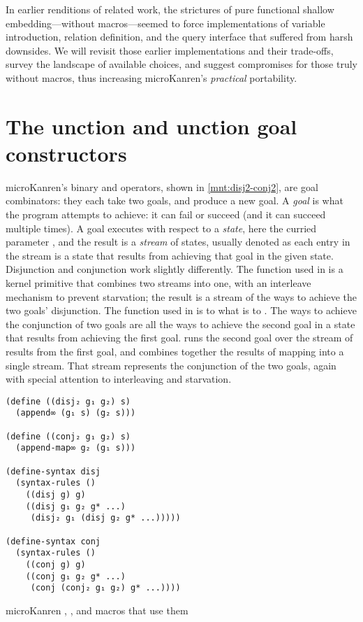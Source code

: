 \documentclass[sigplan,balance=true,pbalance=true,natbib=false]{acmart}
\begin{document}
In earlier renditions of related work, the strictures of pure
functional shallow embedding---without macros---seemed to force
implementations of variable introduction, relation definition, and the
query interface that suffered from harsh downsides. We will revisit
those earlier implementations and their trade-offs, survey the
landscape of available choices, and suggest compromises for those
truly without macros, thus increasing microKanren's \emph{practical}
portability.

\section{The \textmd{}unction and \textmd{}unction
  goal constructors}\label{sec:conde}

microKanren's binary  and 
operators, shown in \cref{mnt:disj2-conj2}, are goal combinators: they
each take two goals, and produce a new goal. A \emph{goal} is what the
program attempts to achieve: it can fail or succeed (and it can
succeed multiple times). A goal executes with respect to a
\emph{state}, here the curried parameter , and the
result is a \emph{stream} of states, usually denoted 
as each entry in the stream is a state that results from achieving
that goal in the given state. Disjunction and conjunction work
slightly differently. The  function used in
 is a kernel primitive that combines two streams
into one, with an interleave mechanism to prevent starvation; the
result is a stream of the ways to achieve the two goals' disjunction.
The  function used in  is to
 what  is to
. The ways to achieve the conjunction of two goals
are all the ways to achieve the second goal in a state that results
from achieving the first goal.\@ {} runs the
second goal over the stream of results from the first goal, and
combines together the results of mapping into a single stream. That
stream represents the conjunction of the two goals, again with special
attention to interleaving and starvation.

\begin{listing}
  \begin{verbatim}
(define ((disj₂ g₁ g₂) s)
  (append∞ (g₁ s) (g₂ s)))

(define ((conj₂ g₁ g₂) s)
  (append-map∞ g₂ (g₁ s)))

(define-syntax disj
  (syntax-rules ()
    ((disj g) g)
    ((disj g₁ g₂ g* ...)
     (disj₂ g₁ (disj g₂ g* ...)))))

(define-syntax conj
  (syntax-rules ()
    ((conj g) g)
    ((conj g₁ g₂ g* ...)
     (conj (conj₂ g₁ g₂) g* ...))))
  \end{verbatim}
  \caption{microKanren , , and macros that use them}\label{mnt:disj2-conj2}
\end{listing}
\end{document}
